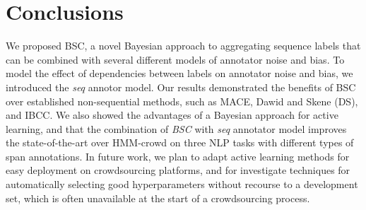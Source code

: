 \section{Conclusions}

We proposed BSC, a novel Bayesian approach to aggregating sequence labels
that can be combined with several different models of annotator noise and bias.
To model the effect of dependencies between labels on annotator noise and bias, we introduced 
the \emph{seq} annotor model.
Our results demonstrated the benefits of BSC over established non-sequential methods, such 
as MACE, Dawid and Skene (DS), and IBCC.
We also showed the advantages of a Bayesian approach for active learning,
and that the combination of \emph{BSC} with \emph{seq} annotator model improves 
the state-of-the-art over HMM-crowd on three NLP tasks with different types of span annotations.
In future work, we plan to adapt active learning methods for easy deployment on crowdsourcing platforms,
and for investigate techniques for automatically selecting good hyperparameters without recourse to a development
set, which is often unavailable at the start of a crowdsourcing process.


